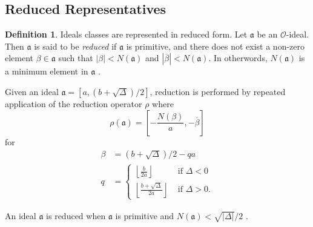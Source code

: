 \documentclass{ucalgthes1}
\theoremstyle{plain}
\theoremstyle{definition}
\newtheorem{defn}[thm]{Definition}
\newcommand{\OO}{\mathcal{O}}
\newcommand{\floor}[1]{\left\lfloor #1 \right\rfloor}
\begin{document}
\subsection{Reduced Representatives}
\label{subsec:reduction}
\begin{defn}
Ideals classes are represented in reduced form. Let $\mathfrak{a}$ be an $\OO$-ideal. Then $\mathfrak{a}$ is said to be \emph{reduced} if $\mathfrak{a}$ is primitive, and there does not exist a non-zero element $\beta \in \mathfrak{a}$ such that $|\beta| < N(\mathfrak{a})$ and $|\overline{\beta}| < N(\mathfrak{a})$.  In otherwords, $N(\mathfrak{a})$ is a minimum element in $\mathfrak{a}$ \cite[p.~98]{Jac09}.
\end{defn}

Given an ideal $\mathfrak a = [a, (b+\sqrt\Delta)/2]$, reduction is performed by repeated application of the reduction operator $\rho$ \cite[Lecture 2, Slide 5/21]{JacLecture} where
\[
	\rho(\mathfrak a) = \left[-\frac{N(\beta)}{a}, -\overline{\beta}\right]
\]
for
\begin{align*}
	\beta &= (b+\sqrt\Delta)/2 -qa \\
	q &= \begin{cases}
		\floor{\frac{b}{2a}} & \mbox{ if } \Delta < 0 \\
		\floor{\frac{b+\sqrt\Delta}{2a}} & \mbox{ if } \Delta > 0.
	\end{cases}
\end{align*}

\noindent
An ideal $\mathfrak a$ is reduced when $\mathfrak a$ is primitive and $N(\mathfrak a) < \sqrt{|\Delta|}/2$ \cite[Theorem 5.6 p.99, and Theorem 5.9 p.101]{Jac09}.  %
\end{document}
